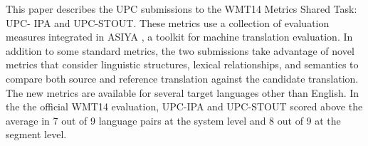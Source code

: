 This paper describes the UPC submissions to the WMT14 Metrics Shared Task: UPC- IPA and UPC-STOUT. These metrics use a collection of evaluation measures integrated in ASIYA , a toolkit for machine translation evaluation. In addition to some standard metrics, the two submissions take advantage of novel metrics that consider linguistic structures, lexical relationships, and semantics to compare both source and reference translation against the candidate translation. The new metrics are available for several target languages other than English. In the the official WMT14 evaluation, UPC-IPA and UPC-STOUT scored above the average in 7 out of 9 language pairs at the system level and 8 out of 9 at the segment level.

